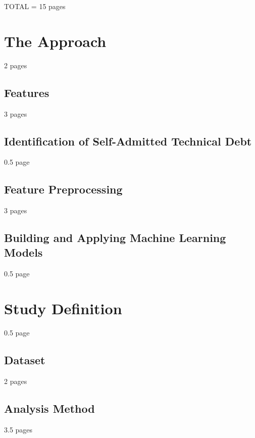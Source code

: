 \label{sec:Theme1}

TOTAL = 15 pages

\section{The Approach}

2 pages

\subsection{Features}

3 pages

\subsection{Identification of Self-Admitted Technical Debt}

0.5 page

\subsection{Feature Preprocessing}

3 pages

\subsection{Building and Applying Machine Learning Models}

0.5 page
	
\section{Study Definition}

0.5 page

\subsection{Dataset}

2 pages

\subsection{Analysis Method}

3.5 pages